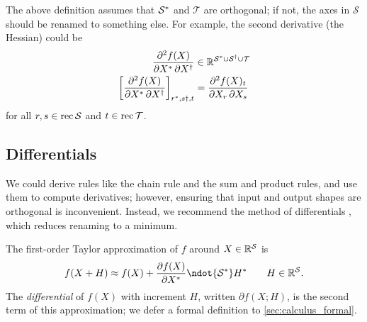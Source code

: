 The above definition assumes that $\mathcal{S}^*$ and $\mathcal{T}$ are orthogonal; if not, the axes in $ \mathcal{S}$ should be renamed to something else. For example, the second derivative (the Hessian) could be
\begin{align*}
\frac{\partial^2 f(X)}{\partial X^* \, \partial X^\dagger} &\in \mathbb{R}^{\mathcal{S}^* \cup \mathcal{S}^\dagger \cup \mathcal{T}} \\
\left[\frac{\partial^2 f(X)}{\partial X^* \, \partial X^\dagger}\right]_{r^*, s\dagger, t} &= \frac{\partial^2 f(X)_t}{\partial X_r \, \partial X_s}
\end{align*}
for all $r, s \in \operatorname{rec}\mathcal{S}$ and $t \in \operatorname{rec}\mathcal{T}$.

\subsection{Differentials}

We could derive rules like the chain rule and the sum and product rules, and use them to compute derivatives; however, ensuring that input and output shapes are orthogonal is inconvenient. Instead, we recommend the method of differentials \citep{magnus+neudecker:1985}, which reduces renaming to a minimum.

The first-order Taylor approximation of $f$ around $X \in \mathbb{R}^{\mathcal{S}}$ is
\begin{equation*}
  f(X+H) \approx f(X) + \ddx{f(X)} \ndot{\mathcal{S}\inax} H\inax \qquad H \in \reals^{\mathcal{S}}.
\end{equation*}
The \emph{differential} of $f(X)$ with increment $H$, written $\partial f (X; H)$, is the second term of this approximation;
we defer a formal definition to \cref{sec:calculus_formal}.


